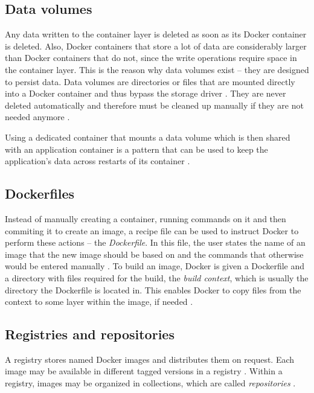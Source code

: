 
  \subsection{Data volumes} %
  \label{sub:data_volumes}
    Any data written to the container layer is deleted as soon as its Docker container is deleted.
    Also, Docker containers that store a lot of data are considerably larger than Docker containers that do not, since the write operations require space in the container layer. This is the reason why data volumes exist -- they are designed to persist data. Data volumes are directories or files that are mounted directly into a Docker container and thus bypass the storage driver \cite{Docker2016Docker}. They are never deleted automatically and therefore must be cleaned up manually if they are not needed anymore \cite{Docker2016Docker}.

    Using a dedicated container that mounts a data volume which is then shared with an application container is a pattern that can be used to keep the application's data across restarts of its container \cite{Docker2016Docker}.


  \subsection{Dockerfiles} %
  \label{sub:dockerfiles}
    Instead of manually creating a container, running commands on it and then commiting it to create an image, a recipe file can be used to instruct Docker to perform these actions -- the \emph{Dockerfile}. In this file, the user states the name of an image that the new image should be based on and the commands that otherwise would be entered manually \cite{Docker2016Docker}.
    To build an image, Docker is given a Dockerfile and a directory with files required for the build, the \emph{build context}, which is usually the directory the Dockerfile is located in. This enables Docker to copy files from the context to some layer within the image, if needed \cite{Docker2016Docker}.

  \subsection{Registries and repositories} %
  \label{sub:registries_and_repositories}
    A registry stores named Docker images and distributes them on request. Each image may be available in different tagged versions in a registry \cite{Docker2016Docker}.
    Within a registry, images may be organized in collections, which are called \emph{repositories} \cite{Docker2016Docker}.

